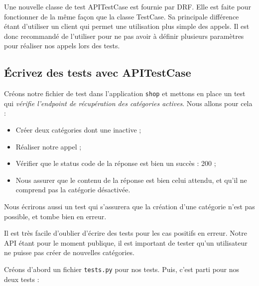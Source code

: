 \documentclass[a4paper]{article}
\begin{document}
Une nouvelle classe de test {\color{monOrange}APITestCase}  est fournie par DRF. Elle est faite pour fonctionner de la même façon que la classe {\color{monOrange}TestCase}. Sa principale différence étant d’utiliser un client qui permet une utilisation plus simple des appels. Il est donc recommandé de l’utiliser pour ne pas avoir à définir plusieurs paramètres pour réaliser nos appels lors des tests.

\subsection{Écrivez des tests avec APITestCase}
Créons notre fichier de test dans l’application {\tt shop}  et mettons en place un test qui {\em vérifie l’endpoint de récupération des catégories actives}. Nous allons pour cela :
\begin{itemize}
\item Créer deux catégories dont une inactive ;
\item Réaliser notre appel ;
\item Vérifier que le status code de la réponse est bien un succès : 200 ; 
\item Nous assurer que le contenu de la réponse est bien celui attendu, et qu'il ne comprend pas la catégorie désactivée.
\end{itemize}
Nous écrirons aussi un test qui s’assurera que la création d’une catégorie n’est pas possible, et tombe bien en erreur.
\begin{theorem}
Il est très facile d’oublier d’écrire des tests pour les cas positifs en erreur. Notre API étant pour le moment publique, il est important de tester qu’un utilisateur ne puisse pas créer de nouvelles catégories.
\end{theorem}
Créons d'abord un fichier  {\tt tests.py}  pour nos tests. Puis, c’est parti pour nos deux tests :
\end{document}

